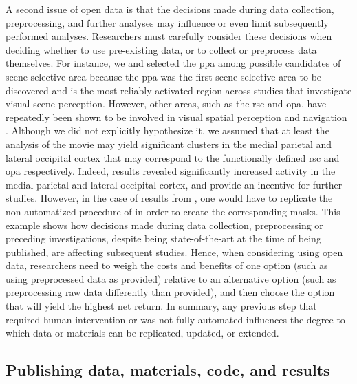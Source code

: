 A second issue of open data is that the decisions made during data collection,
preprocessing, and further analyses may influence or even limit subsequently
performed analyses.
%
Researchers must carefully consider these decisions when deciding whether to use
pre-existing data, or to collect or preprocess data themselves.
%
For instance, we and \citet{sengupta2016extension} selected the \ac{ppa} among
possible candidates of scene-selective area because the \ac{ppa} was the first
scene-selective area to be discovered and is the most reliably activated region
across studies that investigate visual scene perception.
%
However, other areas, such as the \ac{rsc} and \ac{opa}, have repeatedly been
shown to be involved in visual spatial perception and navigation
\citep{chrastil2018heterogeneity, bettencourt2013role, dilks2013occipital,
epstein2019scene}.
%
Although we did not explicitly hypothesize it, we assumed that at least the
analysis of the movie may yield significant clusters in the medial parietal and
lateral occipital cortex that may correspond to the functionally defined
\ac{rsc} and \ac{opa} respectively.
%
Indeed, results revealed significantly increased activity in the medial parietal
and lateral occipital cortex, and provide an incentive for further studies.
However, in the case of results from \citep{sengupta2016extension}, one would
have to replicate the non-automatized procedure of \citet{sengupta2016extension}
in order to create the corresponding masks.
%
This example shows how decisions made during data collection, preprocessing or
preceding investigations, despite being state-of-the-art at the time of being
published, are affecting subsequent studies.
Hence, when considering using open data, researchers need to weigh the costs and
benefits of one option (such as using preprocessed data as provided) relative to
an alternative option (such as preprocessing raw data differently than
provided), and then choose the option that will yield the highest net return.
%
In summary, any previous step that required human intervention or was not fully
automated influences the degree to which data or materials can be replicated,
updated, or extended.




\subsection{Publishing data, materials, code, and results}

